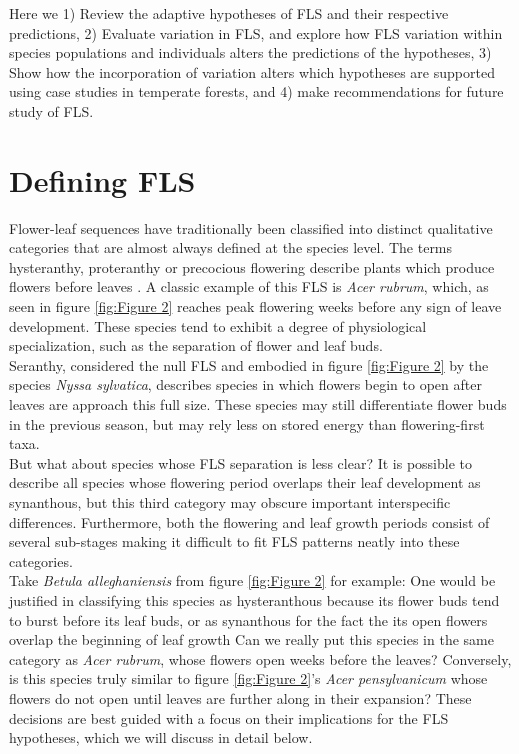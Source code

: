 \documentclass[12pt]{article}\usepackage[]{graphicx}\usepackage[]{color}
\begin{document}
\indent Here we 1) Review the adaptive hypotheses of FLS and their respective predictions, 2) Evaluate variation in FLS, and explore how FLS variation within species populations and individuals alters the predictions of the hypotheses, 3) Show how the incorporation of variation alters which hypotheses are supported using case studies in temperate forests, and 4) make recommendations for future study of FLS. 
\section*{Defining FLS}
\indent\indent Flower-leaf sequences have traditionally been classified into distinct qualitative categories that are almost always defined at the species level. The terms hysteranthy, proteranthy or precocious flowering describe plants which produce flowers before leaves \citep{}. A classic example of this FLS is \textit{Acer rubrum}, which, as seen in figure \ref{fig:Figure 2} reaches peak flowering weeks before any sign of leave development. These species tend to exhibit a degree of physiological specialization, such as the separation of flower and leaf buds. \\
\indent Seranthy, considered the null FLS %
and embodied in figure \ref{fig:Figure 2} by the species \textit{Nyssa sylvatica}, describes species in which flowers begin to open after leaves are approach this full size. These species may still differentiate flower buds in the previous season, but may rely less on stored energy than flowering-first taxa.\\
\indent But what about species whose FLS separation is less clear? It is possible to describe all species whose flowering period overlaps their leaf development as synanthous, but this third category may obscure important interspecific differences. Furthermore, both the flowering and leaf growth periods consist of several sub-stages making it difficult to fit FLS patterns neatly into these categories.\\
 \indent Take \textit{Betula alleghaniensis} from figure \ref{fig:Figure 2} for example: One would be justified in classifying this species as hysteranthous because its flower buds tend to burst before its leaf buds, or as synanthous for the fact the its open flowers overlap the beginning of leaf growth Can we really put this species in the same category as \textit{Acer rubrum}, whose flowers open weeks before the leaves? Conversely, is this species truly similar to figure \ref{fig:Figure 2}'s \textit{Acer pensylvanicum} whose flowers do not open until leaves are further along in their expansion?  These decisions are best guided with a focus on their implications for the FLS hypotheses, which we will discuss in detail below. 
\end{document}
